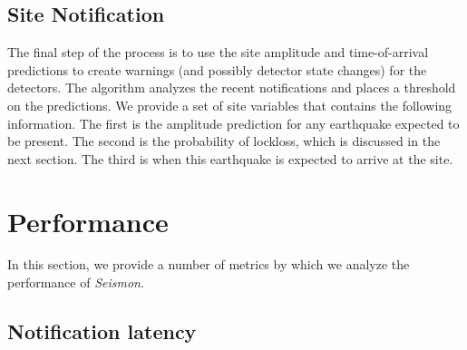 \documentclass[reprint, prl, aps, showpacs]{revtex4-1}
\begin{document}
\subsection{Site Notification}
The final step of the process is to use the site amplitude and time-of-arrival predictions to create warnings (and possibly detector state changes) for the detectors. The algorithm analyzes the recent notifications and places a threshold on the predictions. We provide a set of site variables that contains the following information. The first is the amplitude prediction for any earthquake expected to be present.
The second is the probability of lockloss, which is discussed in the next section. The third is when this earthquake is expected to arrive at the site.
		
\section{Performance}
\label{sec:performance}

In this section, we provide a number of metrics by which we analyze the performance of \emph{Seismon}.

\subsection{Notification latency}
\end{document}
